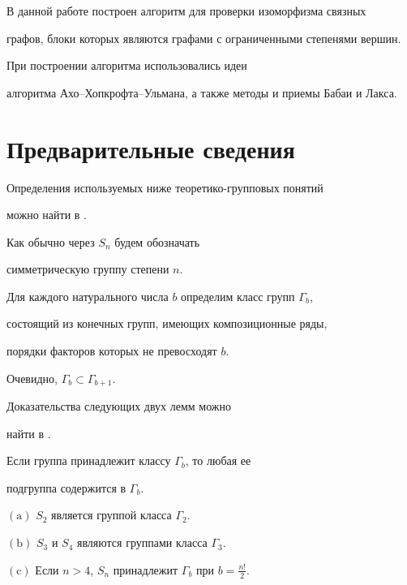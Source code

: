 В данной работе построен алгоритм для проверки изоморфизма связных


графов, блоки которых являются графами с ограниченными степенями вершин.


При построении алгоритма использовались идеи


алгоритма Ахо--Хопкрофта--Ульмана, а также методы и приемы Бабаи и Лакса.








\section{Предварительные сведения}





Определения используемых ниже теоретико-групповых понятий


можно найти в \cite{Karg_Mer}.


Как обычно через $S_n$ будем обозначать


симметрическую группу степени $n$.


Для каждого натурального числа $b$ определим класс групп $\Gamma_b$,


состоящий из конечных групп, имеющих композиционные ряды,


порядки факторов которых не превосходят $b$.


Очевидно, $\Gamma_b\subset\Gamma_{b+1}$.


Доказательства следующих двух лемм можно


найти в \cite{Hoffmann}.





\begin{lems}


Если группа принадлежит классу $\Gamma_b$, то любая ее


подгруппа содержится в $\Gamma_b$.


\label{l53}


\end{lems}





\begin{lems}


$(\mathrm a)$ $S_2$ является группой класса $\Gamma_2$.





$(\mathrm b)$ $S_3$ и $S_4$ являются группами класса $\Gamma_3$.





$(\mathrm c)$ Если $n>4$, $S_n$ принадлежит $\Gamma_b$ при $b=\frac{n!}2$.


\label{l54}


\end{lems}





